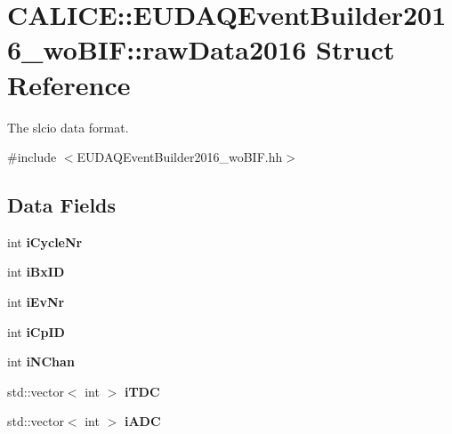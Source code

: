 \section{C\-A\-L\-I\-C\-E\-:\-:E\-U\-D\-A\-Q\-Event\-Builder2016\-\_\-wo\-B\-I\-F\-:\-:raw\-Data2016 Struct Reference}
\label{structCALICE_1_1EUDAQEventBuilder2016__woBIF_1_1rawData2016}


The slcio data format.  




{\ttfamily \#include $<$E\-U\-D\-A\-Q\-Event\-Builder2016\-\_\-wo\-B\-I\-F.\-hh$>$}

\subsection*{Data Fields}
\begin{DoxyCompactItemize}
\item 
int {\bfseries i\-Cycle\-Nr}\label{structCALICE_1_1EUDAQEventBuilder2016__woBIF_1_1rawData2016_a60345bf308d7a9c2aea61058bbcae186}

\item 
int {\bfseries i\-Bx\-I\-D}\label{structCALICE_1_1EUDAQEventBuilder2016__woBIF_1_1rawData2016_a3b0a013af57afc6c66d51544912accdd}

\item 
int {\bfseries i\-Ev\-Nr}\label{structCALICE_1_1EUDAQEventBuilder2016__woBIF_1_1rawData2016_acaf440a212bc84243d58377081b964bd}

\item 
int {\bfseries i\-Cp\-I\-D}\label{structCALICE_1_1EUDAQEventBuilder2016__woBIF_1_1rawData2016_ae22ff69e72deb92b788c4f92a74fa9cd}

\item 
int {\bfseries i\-N\-Chan}\label{structCALICE_1_1EUDAQEventBuilder2016__woBIF_1_1rawData2016_afd98d07285d886e0659297eb7b6679cf}

\item 
std\-::vector$<$ int $>$ {\bfseries i\-T\-D\-C}\label{structCALICE_1_1EUDAQEventBuilder2016__woBIF_1_1rawData2016_aeee048eee49339800053b4b30f363486}

\item 
std\-::vector$<$ int $>$ {\bfseries i\-A\-D\-C}\label{structCALICE_1_1EUDAQEventBuilder2016__woBIF_1_1rawData2016_a2d70d493fb1d0ce9cec3a3f5679e4c42}

\end{DoxyCompactItemize}



